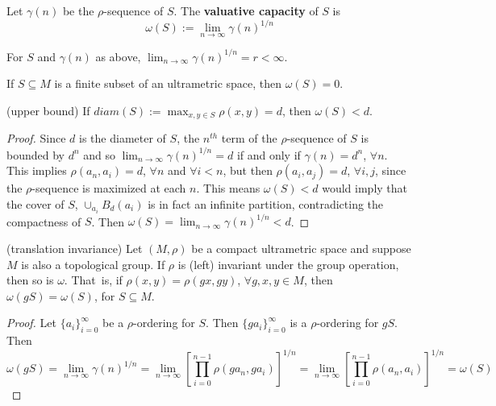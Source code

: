 \begin{definition*}
	\cite{kj}  Let $\gamma(n)$ be the $\rho$-sequence of $S$. The \textbf{valuative capacity} of $S$ is \[\omega(S)
	:= \lim_{n\to\infty} \gamma(n)^{1/n}\]  
\end{definition*}


\begin{proposition*}
	\cite{kj} For $S$ and $\gamma(n)$ as above,  $\lim_{n\to\infty} \gamma(n)^{1/n} = r < \infty$. 
\end{proposition*}


\begin{proposition*}
	If $S \subseteq M$ is a finite subset of an ultrametric space, then $\omega(S) =0$.
\end{proposition*}


\begin{proposition*}
	(upper bound) If $diam(S)  := \max_{x,y \in S} \rho(x,y)= d$, then $\omega(S) < d$.
\end{proposition*}

\begin{proof}
	Since $d$ is the diameter of $S$, the $n^{th}$ term of the $\rho$-sequence of $S$ is bounded by $d^n$ and so $ \lim_{n\to\infty} \gamma(n)^{1/n}=d$ if and only if $\gamma(n)=d^n$, $\forall n$. This implies $\rho(a_n, a_i) = d$, $\forall n$ and $\forall i < n$, but then $\rho(a_i,a_j)=d$, $\forall i,j$, since the $\rho$-sequence is maximized at each $n$. This means $\omega(S) < d$ would imply that the cover of $S$, $\cup_{a_i} B_d(a_i)$ is in fact an infinite partition, contradicting the compactness of $S$. Then  $\omega(S)= \lim_{n\to\infty} \gamma(n)^{1/n}<d$. 
\end{proof}



\begin{proposition*}
	(translation invariance) Let $(M, \rho)$ be a compact ultrametric space and suppose $M$ is also a topological group. If $\rho$ is (left) invariant under the group operation, then so is $\omega$. That\ is, if $\rho(x,y)=\rho(gx,gy)$, $ \forall g,x,y \in M$, then $\omega(gS)=\omega(S)$, for $S \subseteq M$.	
\end{proposition*}

\begin{proof}
	Let $\{a_i\}_{i=0}^\infty$ be a $\rho$-ordering for $S$. Then $\{ga_i\}_{i=0}^\infty$ is a $\rho$-ordering for $gS$. Then $$\omega(gS) = \lim_{n\to\infty} \gamma(n)^{1/n} =  \lim_{n\to\infty} [\prod_{i=0}^{n-1} \rho(ga_n,ga_i)]^{1/n} = \lim_{n\to\infty} [\prod_{i=0}^{n-1} \rho(a_n,a_i)]^{1/n}	 = \omega(S)$$
\end{proof}	

